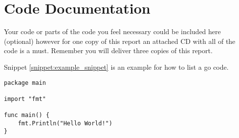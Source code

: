 \chapter{Code Documentation}
Your code or parts of the code you feel necessary could be included here (optional)  however  for one copy of this report an  attached  CD with all of the code is a must.
Remember you will  deliver three copies of this report.

Snippet \ref{snippet:example_snippet} is an example for how to list a go code.
\setGolang
\begin{lstlisting}[caption={This is caption},label=snippet:example_snippet]
package main

import "fmt"

func main() {
    fmt.Println("Hello World!")
}
\end{lstlisting}
